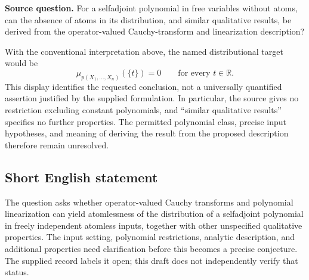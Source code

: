 \documentclass[11pt]{article}
\newcommand{\R}{\mathbb{R}}
\begin{document}
\textbf{Source question.} For a selfadjoint polynomial in free variables without atoms, can the absence of atoms in its distribution, and similar qualitative results, be derived from the operator-valued Cauchy-transform and linearization description?

With the conventional interpretation above, the named distributional target would be
\[
\mu_{p(X_1,\ldots,X_n)}(\{t\})=0\qquad\text{for every }t\in\R.
\]
This display identifies the requested conclusion, not a universally quantified assertion justified by the supplied formulation. In particular, the source gives no restriction excluding constant polynomials, and ``similar qualitative results'' specifies no further properties. The permitted polynomial class, precise input hypotheses, and meaning of deriving the result from the proposed description therefore remain unresolved.
\subsection{Short English statement}
The question asks whether operator-valued Cauchy transforms and polynomial linearization can yield atomlessness of the distribution of a selfadjoint polynomial in freely independent atomless inputs, together with other unspecified qualitative properties. The input setting, polynomial restrictions, analytic description, and additional properties need clarification before this becomes a precise conjecture. The supplied record labels it open; this draft does not independently verify that status.
\end{document}
